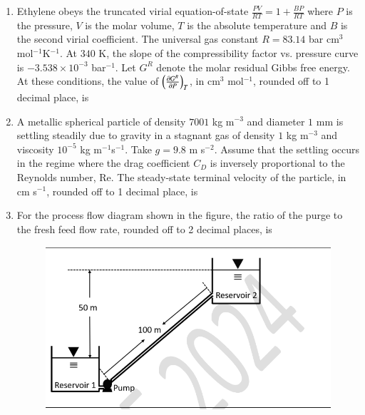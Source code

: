 \documentclass[journal,12pt,onecolumn]{IEEEtran}
\theoremstyle{remark}
\begin{document}
\begin{enumerate}
	\hfill{}
	
	\item Ethylene obeys the truncated virial equation-of-state $\frac{PV}{RT} = 1 + \frac{BP}{RT}$ where $P$ is the pressure, $V$ is the molar volume, $T$ is the absolute temperature and $B$ is the second virial coefficient. The universal gas constant $R = 83.14$ bar cm$^3$ mol$^{-1}$K$^{-1}$. At $340$ K, the slope of the compressibility factor vs. pressure curve is $-3.538 \times 10^{-3}$ bar$^{-1}$. Let $G^R$ denote the molar residual Gibbs free energy. At these conditions, the value of $\left(\frac{\partial G^R}{\partial P}\right)_T$, in cm$^3$ mol$^{-1}$, rounded off to 1 decimal place, is \underline{\hspace{2cm}}
	
	\hfill{}
	
	\item A metallic spherical particle of density $7001$ kg m$^{-3}$ and diameter $1$ mm is settling steadily due to gravity in a stagnant gas of density $1$ kg m$^{-3}$ and viscosity $10^{-5}$ kg m$^{-1}$s$^{-1}$. Take $g = 9.8$ m s$^{-2}$. Assume that the settling occurs in the regime where the drag coefficient $C_D$ is inversely proportional to the Reynolds number, $\text{Re}$. The steady-state terminal velocity of the particle, in cm s$^{-1}$, rounded off to 1 decimal place, is \underline{\hspace{2cm}}
	
	\hfill{}
	
	\item For the process flow diagram shown in the figure, the ratio of the purge to the fresh feed flow rate, rounded off to 2 decimal places, is \underline{\hspace{2cm}}
	\begin{figure}
		\includegraphics[width = 0.8\columnwidth]{q59}
		\caption*{}
		\label{fig:q59}
	\end{figure}
	

\end{enumerate}
\end{document}
